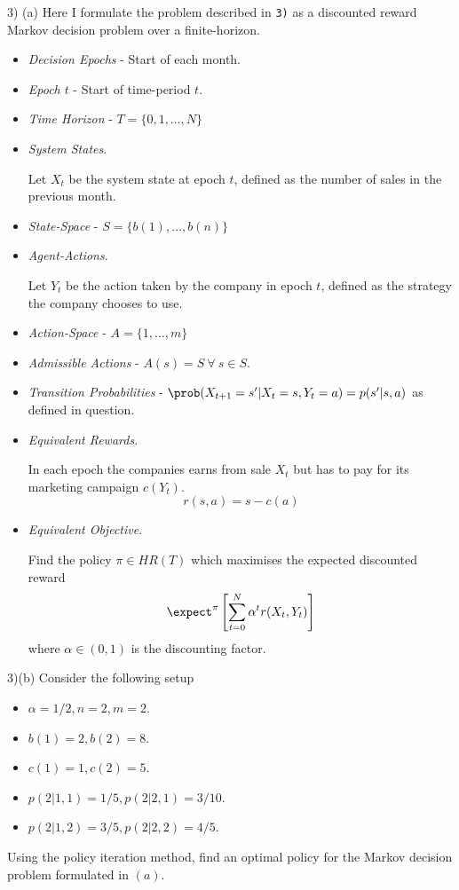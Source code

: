 \documentclass[11pt,a4paper]{article}
\begin{document}
\begin{answer}{3) (a)}
  Here I formulate the problem described in \texttt{3)} as a discounted reward Markov decision problem over a finite-horizon.
  \begin{itemize}
    \item \textit{Decision Epochs} - Start of each month.
    \item \textit{Epoch $t$} - Start of time-period $t$.
    \item \textit{Time Horizon} - $T=\{0,1,\dots,N\}$
    \item \textit{System States}.
    \par Let $X_t$ be the system state at epoch $t$, defined as the number of sales in the previous month.
    \item \textit{State-Space} - $S=\{b(1),\dots,b(n)\}$
    \item \textit{Agent-Actions}.
    \par Let $Y_t$ be the action taken by the company in epoch $t$, defined as the strategy the company chooses to use.
    \item \textit{Action-Space} - $A=\{1,\dots,m\}$
    \item \textit{Admissible Actions} - $A(s)=S\ \forall\ s\in S$.
    \item \textit{Transition Probabilities} - $\prob(X_{t+1}=s'|X_t=s,Y_t=a)=p(s'|s,a)$ as defined in question.
    \item \textit{Equivalent Rewards}.
    \par In each epoch the companies earns from sale $X_t$ but has to pay for its marketing campaign $c(Y_t)$.
    \[ r(s,a)=s-c(a) \]
    \item \textit{Equivalent Objective}.
    \par Find the policy $\pi\in HR(T)$ which maximises the expected discounted reward
    \[ \expect^\pi\left[\sum_{t=0}^N\alpha^tr(X_t,Y_t)\right] \]
    where $\alpha\in(0,1)$ is the discounting factor.
  \end{itemize}
\end{answer}

\begin{question}{3)(b)}
  Consider the following setup
  \begin{itemize}
    \item $\alpha=1/2,n=2,m=2$.
    \item $b(1)=2,b(2)=8$.
    \item $c(1)=1,c(2)=5$.
    \item $p(2|1,1)=1/5,p(2|2,1)=3/10$.
    \item $p(2|1,2)=3/5,p(2|2,2)=4/5$.
  \end{itemize}
  Using the policy iteration method, find an optimal policy for the Markov decision problem formulated in $(a)$.
\end{question}
\end{document}
